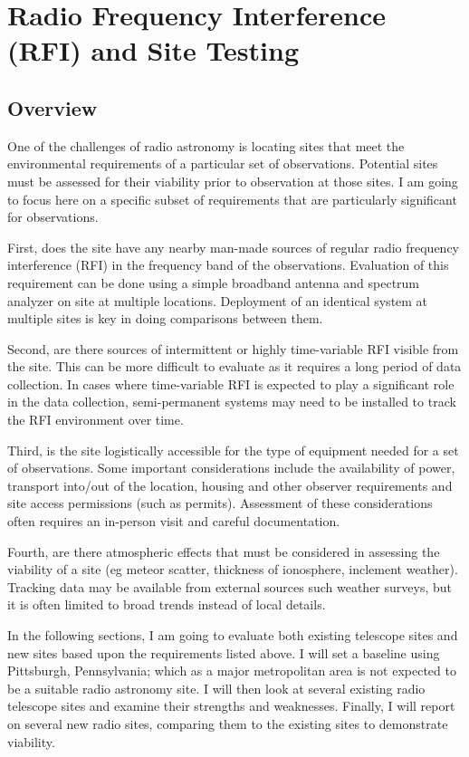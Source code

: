 \chapter{Radio Frequency Interference (RFI) and Site Testing}

\section{Overview}

One of the challenges of radio astronomy is locating sites that meet the environmental requirements of a particular set of observations. Potential sites must be assessed for their viability prior to observation at those sites. I am going to focus here on a specific subset of requirements that are particularly significant for \cm observations. 

First, does the site have any nearby man-made sources of regular radio frequency interference (RFI) in the frequency band of the observations. Evaluation of this requirement can be done using a simple broadband antenna and spectrum analyzer on site at multiple locations. Deployment of an identical system at multiple sites is key in doing comparisons between them. 

Second, are there sources of intermittent or highly time-variable RFI visible from the site. This can be more difficult to evaluate as it requires a long period of data collection. In cases where time-variable RFI is expected to play a significant role in the data collection, semi-permanent systems may need to be installed to track the RFI environment over time. 

Third, is the site logistically accessible for the type of equipment needed for a set of observations. Some important considerations include the availability of power, transport into/out of the location, housing and other observer requirements and site access permissions (such as permits). Assessment of these considerations often requires an in-person visit and careful documentation. 

Fourth, are there atmospheric effects that must be considered in assessing the viability of a site (eg meteor scatter, thickness of ionosphere, inclement weather). Tracking data may be available from external sources such weather surveys, but it is often limited to broad trends instead of local details. 

In the following sections, I am going to evaluate both existing telescope sites and new sites based upon the requirements listed above. I will set a baseline using Pittsburgh, Pennsylvania; which as a major metropolitan area is not expected to be a suitable radio astronomy site. I will then look at several existing radio telescope sites and examine their strengths and weaknesses. Finally, I will report on several new radio sites, comparing them to the existing sites to demonstrate viability. 

